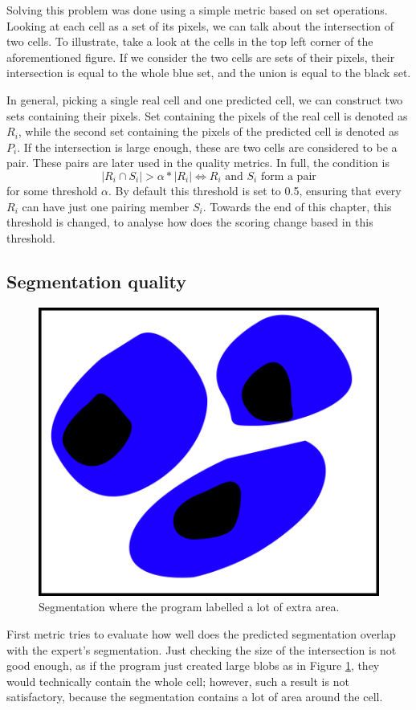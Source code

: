 \documentclass[
  digital,     %
  oneside,     %
  nosansbold,  %
  nocolorbold, %
  lof,         %
  lot,         %
]{fithesis4}
\begin{document}
Solving this problem was done using a simple metric based on set operations.
Looking at each cell as a set of its pixels, we can talk about the intersection
of two cells. To illustrate, take a look at the cells in the top left corner of
the aforementioned figure. If we consider the two cells are sets of their
pixels, their intersection is equal to the whole blue set, and the union is
equal to the black set.

In general, picking a single real cell and one predicted cell, we can construct
two sets containing their pixels. Set containing the pixels of the real cell is
denoted as $R_i$, while the second set containing the pixels of the predicted
cell is denoted as $P_i$. If the intersection is large enough, these are two
cells are considered to be a pair. These pairs are later used in the quality
metrics. In full, the condition is
$$|R_i \cap S_i| > \alpha * |R_i| \Leftrightarrow R_i \text{ and } S_i \text{ form a pair}$$
for some threshold $\alpha$. By default this threshold is set to 0.5, ensuring
that every $R_i$ can have just one pairing member $S_i$. Towards the end of this
chapter, this threshold is changed, to analyse how does the scoring change based
in this threshold.

\subsection{Segmentation quality}
\begin{figure}
    \begin{center}
        \includegraphics{resources/inkscape/evaluation_imprecise_segmentation.png}
    \end{center}
    \caption{Segmentation where the program labelled a lot of extra area.}
    \label{fig:evaluation_imprecise}
\end{figure}
First metric tries to evaluate how well does the predicted segmentation overlap
with the expert's segmentation. Just checking the size of the intersection is
not good enough, as if the program just created large blobs as in Figure
\ref{fig:evaluation_imprecise}, they would technically contain the whole cell;
however, such a result is not satisfactory, because the segmentation contains a
lot of area around the cell.
\end{document}

